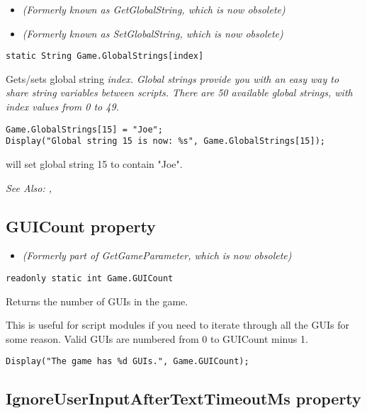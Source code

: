 \begin{itemize}
\item \it{(Formerly known as GetGlobalString, which is now obsolete)}
\item \it{(Formerly known as SetGlobalString, which is now obsolete)}
\end{itemize}

\begin{verbatim}
static String Game.GlobalStrings[index]
\end{verbatim}
Gets/sets global string \it{index}. Global strings provide you with an easy way to share
string variables between scripts. There are 50 available global strings, with \it{index}
values from 0 to 49.

\begin{verbatim}
Game.GlobalStrings[15] = "Joe";
Display("Global string 15 is now: %s", Game.GlobalStrings[15]);
\end{verbatim}
will set global string 15 to contain "Joe".

\it{See Also:} , 


\subsection{GUICount property}\label{Game.GUICount}%

\begin{itemize}
\item \it{(Formerly part of GetGameParameter, which is now obsolete)}
\end{itemize}

\begin{verbatim}
readonly static int Game.GUICount
\end{verbatim}
Returns the number of GUIs in the game.

This is useful for script modules if you need to iterate through all the GUIs for some reason.
Valid GUIs are numbered from 0 to GUICount minus 1.

\begin{verbatim}
Display("The game has %d GUIs.", Game.GUICount);
\end{verbatim}


\subsection{IgnoreUserInputAfterTextTimeoutMs property}\label{Game.IgnoreUserInputAfterTextTimeoutMs}%

